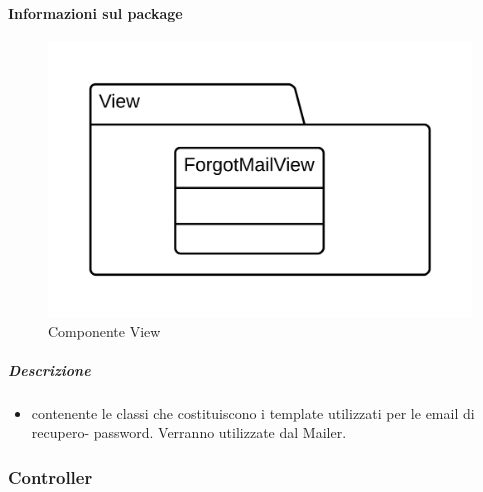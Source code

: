   \paragraph{Informazioni sul package} 
    \begin{figure}[H] 
      \begin{center} 
        \includegraphics[width=\textwidth]{packages/Back-end::Lib::View.png}  
        \caption{Componente View}
      \end{center}  
    \end{figure} 
  \subparagraph{Descrizione} 
    \begin{itemize}
    \item[]  contenente le classi che costituiscono i template utilizzati per le email di recupero-
password. Verranno utilizzate dal  Mailer.

    \end{itemize} 
  \subsubsection{Controller}

